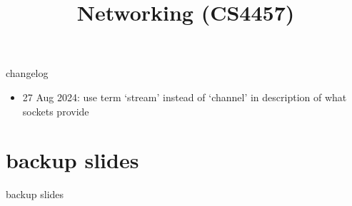 \date{}
\title{Networking (CS4457)}
\date{}

\begin{frame}
    \titlepage
\end{frame}

{\changelogmode
\begin{frame}{changelog}
\begin{itemize}
\item 27 Aug 2024: use term `stream' instead of `channel' in description of what sockets provide
\end{itemize}
\end{frame}
}






\section{backup slides}
\begin{frame}{backup slides}
\end{frame}



